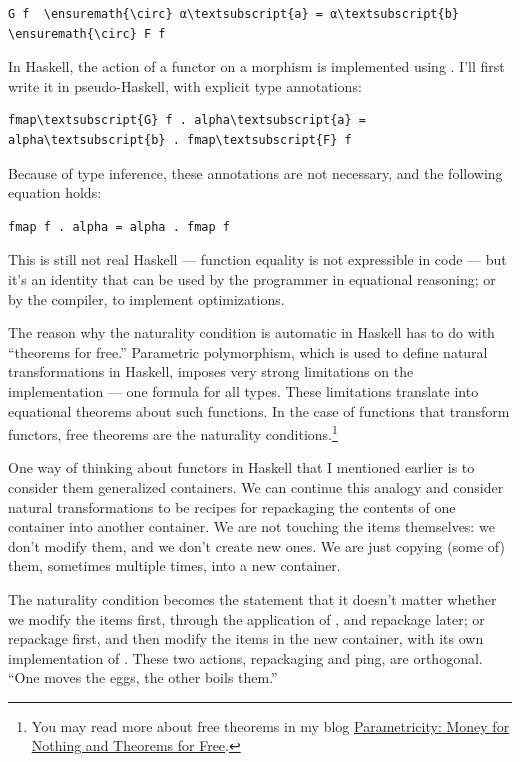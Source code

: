 \begin{Verbatim}[commandchars=\\\{\}]
G f  \ensuremath{\circ} α\textsubscript{a} = α\textsubscript{b}  \ensuremath{\circ} F f
\end{Verbatim}
In Haskell, the action of a functor  on a morphism 
is implemented using . I'll first write it in
pseudo-Haskell, with explicit type annotations:

\begin{Verbatim}[commandchars=\\\{\}]
fmap\textsubscript{G} f . alpha\textsubscript{a} = alpha\textsubscript{b} . fmap\textsubscript{F} f
\end{Verbatim}
Because of type inference, these annotations are not necessary, and the
following equation holds:

\begin{Verbatim}[commandchars=\\\{\}]
fmap f . alpha = alpha . fmap f
\end{Verbatim}
This is still not real Haskell --- function equality is not expressible
in code --- but it's an identity that can be used by the programmer in
equational reasoning; or by the compiler, to implement optimizations.

The reason why the naturality condition is automatic in Haskell has to
do with ``theorems for free.'' Parametric polymorphism, which is used to
define natural transformations in Haskell, imposes very strong
limitations on the implementation --- one formula for all types. These
limitations translate into equational theorems about such functions. In
the case of functions that transform functors, free theorems are the
naturality conditions.\footnote{
You may read more about free theorems in my
blog \href{https://bartoszmilewski.com/2014/09/22/parametricity-money-for-nothing-and-theorems-for-free/}{Parametricity:
Money for Nothing and Theorems for Free}.}

One way of thinking about functors in Haskell that I mentioned earlier
is to consider them generalized containers. We can continue this analogy
and consider natural transformations to be recipes for repackaging the
contents of one container into another container. We are not touching
the items themselves: we don't modify them, and we don't create new
ones. We are just copying (some of) them, sometimes multiple times, into
a new container.

The naturality condition becomes the statement that it doesn't matter
whether we modify the items first, through the application of
, and repackage later; or repackage first, and then modify
the items in the new container, with its own implementation of
. These two actions, repackaging and ping, are
orthogonal. ``One moves the eggs, the other boils them.''

